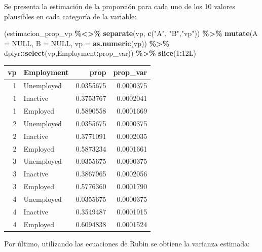 \documentclass[
  spanish,
  12pt,
]{book}
\newenvironment{Shaded}{\begin{snugshade}}{\end{snugshade}}
\newcommand{\AttributeTok}[1]{\textcolor[rgb]{0.13,0.29,0.53}{#1}}
\newcommand{\ConstantTok}[1]{\textcolor[rgb]{0.56,0.35,0.01}{#1}}
\newcommand{\DataTypeTok}[1]{\textcolor[rgb]{0.13,0.29,0.53}{#1}}
\newcommand{\DecValTok}[1]{\textcolor[rgb]{0.00,0.00,0.81}{#1}}
\newcommand{\FunctionTok}[1]{\textcolor[rgb]{0.13,0.29,0.53}{\textbf{#1}}}
\newcommand{\NormalTok}[1]{#1}
\newcommand{\SpecialCharTok}[1]{\textcolor[rgb]{0.81,0.36,0.00}{\textbf{#1}}}
\newcommand{\StringTok}[1]{\textcolor[rgb]{0.31,0.60,0.02}{#1}}
\begin{document}
Se presenta la estimación de la proporción para cada uno de los 10 valores plausibles en cada categoría de la variable:

\begin{Shaded}
\begin{Highlighting}[]
\NormalTok{(estimacion\_prop\_vp }\SpecialCharTok{\%\textless{}\textgreater{}\%} \FunctionTok{separate}\NormalTok{(vp, }\FunctionTok{c}\NormalTok{(}\StringTok{"A"}\NormalTok{, }\StringTok{"B"}\NormalTok{,}\StringTok{"vp"}\NormalTok{)) }\SpecialCharTok{\%\textgreater{}\%} 
\FunctionTok{mutate}\NormalTok{(}\AttributeTok{A =} \ConstantTok{NULL}\NormalTok{, }\AttributeTok{B =} \ConstantTok{NULL}\NormalTok{, }\AttributeTok{vp =} \FunctionTok{as.numeric}\NormalTok{(vp)) }\SpecialCharTok{\%\textgreater{}\%}
\NormalTok{  dplyr}\SpecialCharTok{::}\FunctionTok{select}\NormalTok{(vp,Employment}\SpecialCharTok{:}\NormalTok{prop\_var)) }\SpecialCharTok{\%\textgreater{}\%} \FunctionTok{slice}\NormalTok{(}\DecValTok{1}\SpecialCharTok{:}\DecValTok{12}\DataTypeTok{L}\NormalTok{)}
\end{Highlighting}
\end{Shaded}

\begin{tabular}{r|l|r|r}
\hline
vp & Employment & prop & prop\_var\\
\hline
1 & Unemployed & 0.0355675 & 0.0000375\\
\hline
1 & Inactive & 0.3753767 & 0.0002041\\
\hline
1 & Employed & 0.5890558 & 0.0001669\\
\hline
2 & Unemployed & 0.0355675 & 0.0000375\\
\hline
2 & Inactive & 0.3771091 & 0.0002035\\
\hline
2 & Employed & 0.5873234 & 0.0001661\\
\hline
3 & Unemployed & 0.0355675 & 0.0000375\\
\hline
3 & Inactive & 0.3867965 & 0.0002056\\
\hline
3 & Employed & 0.5776360 & 0.0001790\\
\hline
4 & Unemployed & 0.0355675 & 0.0000375\\
\hline
4 & Inactive & 0.3549487 & 0.0001915\\
\hline
4 & Employed & 0.6094838 & 0.0001524\\
\hline
\end{tabular}

Por último, utilizando las ecuaciones de Rubin se obtiene la varianza estimada:
\end{document}
